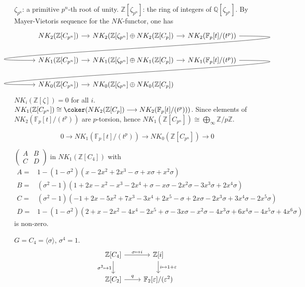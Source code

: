$\zeta_{p^n}$: a primitive $p^n$-th root of unity. $\mathbb{Z}[\zeta_{p^n}]$: the ring of integers of $\mathbb{Q}[\zeta_{p^n}]$.
 By Mayer-Vietoris sequence for the $NK$-functor, one has
    \[\begin{tikzcd}[column sep=small]
		 NK_2(\mathbb{Z}[C_{p^n}]) \ar[r] & NK_2(\mathbb{Z}[\zeta_{p^n}]\oplus NK_2(\mathbb{Z}[C_p]) \ar[r] & NK_2(\mathbb{F}_p[t]/(t^p)) \ar[out=0, in=180, looseness=2, overlay]{dll}   \\
		  NK_1(\mathbb{Z}[C_{p^n}]) \ar[r]  & NK_1(\mathbb{Z}[\zeta_{p^n}]\oplus NK_1(\mathbb{Z}[C_p]) \ar[r]& NK_1(\mathbb{F}_p[t]/(t^p))  \ar[out=0, in=180, looseness=2, overlay]{dll}   \\
		 NK_0(\mathbb{Z}[C_{p^n}]) \ar[r]  & NK_0(\mathbb{Z}[\zeta_{p^n}]\oplus NK_0(\mathbb{Z}[C_p]) 
	\end{tikzcd}\]
$NK_i(\mathbb{Z}[\zeta])=0$ for all $i$. $NK_1(\mathbb{Z}[C_{p^n}])\cong \coker(NK_2(\mathbb{Z}[C_p]) \longrightarrow NK_2(\mathbb{F}_p[t]/(t^p)))$.
Since elements of $NK_2(\mathbb{F}_p[t]/(t^p))$ are $p$-torsion, hence $NK_1(\mathbb{Z}[C_{p^n}])\cong \bigoplus_{\infty}\mathbb{Z}/p\mathbb{Z}$. 

\[0 \longrightarrow NK_1(\mathbb{F}_p[t]/(t^p))  \longrightarrow NK_0(\mathbb{Z}[C_{p^n}]) \longrightarrow 0\]

$\begin{pmatrix}
	A & B\\
	C & D
\end{pmatrix}$ in $NK_1(\mathbb{Z}[C_4])$ with 
\begin{align*}
	A =&1-(1-\sigma^2)(x-2x^2+2x^3-\sigma+x\sigma+x^2\sigma)\\
	B =& (\sigma^2-1)(1+2x-x^2-x^3-2x^4+\sigma-x\sigma-2x^2\sigma-3x^3\sigma+2x^4\sigma)\\
	C =& (\sigma^2-1)(-1+2x-5x^2+7x^3-3x^4+2x^5-\sigma+2x\sigma-2x^3\sigma+3x^4\sigma-2x^5\sigma)\\
	D =& 1-(1-\sigma^2)(2+x-2x^2-4x^4-2x^5+\sigma-3x\sigma-x^2\sigma-4x^3\sigma+6x^4\sigma-4x^5\sigma+4x^6\sigma)
\end{align*}
is non-zero.


$G=C_4=\langle \sigma \rangle$, $\sigma^4=1$.
\[\begin{tikzcd}
			\mathbb{Z}[C_4] \ar[r,"\sigma \mapsto i"] \ar[d,"\sigma^2\mapsto 1"']& \mathbb{Z}[i]\ar[d,"i\mapsto 1+\varepsilon"]\\
			\mathbb{Z}[C_2] \ar[r,"q"] & \mathbb{F}_2[\varepsilon]/(\varepsilon^2)
		\end{tikzcd}\]

